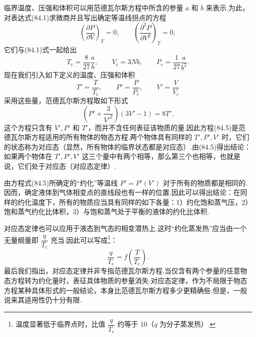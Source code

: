 临界温度、压强和体积可以用范德瓦尔斯方程中所含的参量 $a$ 和 $b$ 来表示.为此，对表达式(84.1)求微商并且写出确定等温线拐点的方程
\begin{equation*}
  \left(\frac{\partial P}{\partial V}\right)_T=0,\qquad
  \left(\frac{\partial^2P}{\partial V^2}\right)_T=0,
\end{equation*}
它们与(84.1)式一起给出
\begin{equation}
  T_{\mathrm{c}}=\frac{8}{27}\frac{a}{b},\qquad
  V_{\mathrm{c}}=3Nb,\qquad
  P_{\mathrm{c}}=\frac{1}{27}\frac{a}{b^2}.
\end{equation}
现在我们引入如下定义的温度、压强和体积
\begin{equation}
  T'=\frac{T}{T_{\mathrm{c}}},\qquad
  P'=\frac{P}{P_{\mathrm{c}}},\qquad
  V'=\frac{V}{V_{\mathrm{c}}}
\end{equation}
采用这些量，范德瓦尔斯方程取如下形式
\begin{equation}
  \left(P'+\frac{3}{V'^2}\right)(3V'-1)=8T'.
\end{equation}
这个方程只含有 $V',P'$ 和 $T'$，而并不含任何表征该物质的量.因此方程(84.5)是范德瓦尔斯方程适用的所有物体的物态方程.两个物体具有同样的 $T',P',V'$ 时，它们的状态称为对应态（显然，所有物体的临界状态都是对应态）.由(84.5)得出结论：如果两个物体在 $T',P',V'$ 这三个量中有两个相等，那么第三个也相等，也就是说，它们处于对应态（对应态定律）.

由方程式(84.5)所确定的“约化”等温线 $P'=P'(V')$ 对于所有的物质都是相同的.因而，确定液体到气体相变点的直线段也有一样的位置.因此可以得出结论：在同样的约化温度下，所有的物质应当具有同样的如下各量：1）约化饱和蒸气压，2）饱和蒸气约化比体积，3）与饱和蒸气处于平衡的液体的约化比体积.

对应态定律也可以应用于液态到气态的相变潜热上.这时“约化蒸发热”应当由一个无量纲量即 $\dfrac{q}{T_{\mathrm{c}}}$ 充当.因此可以写成\footnote{温度显著低于临界点时，比值 $\dfrac{q}{T_{\mathrm{c}}}$ 约等于 10（$q$ 为分子蒸发热）.}：
\begin{equation}
  \frac{q}{T_{\mathrm{c}}}=f\left(\frac{T}{T_{\mathrm{c}}}\right).
\end{equation}
最后我们指出，对应态定律并非专指范德瓦尔斯方程.当仅含有两个参量的任意物态方程转为约化量时，表征具体物质的参量消失.对应态定律，作为不局限于物态方程某种具体形式的一般结论，本身比范德瓦尔斯方程多少更精确些.但是，一般说来其适用性仍十分有限.
